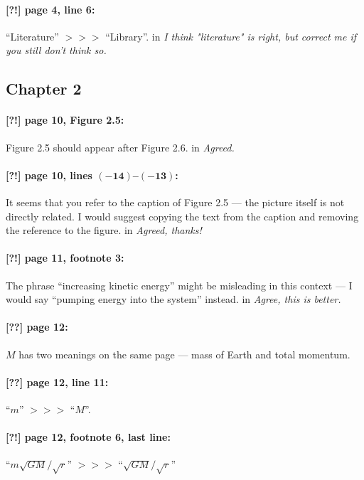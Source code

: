 \documentclass[twoside]{article}
\begin{document}
\paragraph{[?!] page 4, line 6:} “Literature” $>\!>\!>$ “Library”.
 in {\it  I think "literature" is right, but correct me if you still don't think so.}

\subsection*{Chapter 2}

\paragraph{[?!] page 10, Figure 2.5:} Figure 2.5 should appear after Figure 2.6.
 in {\it  Agreed.}

\paragraph{[?!] page 10, lines $\bm{(-14)}$--$\bm{(-13)}$:}
It seems that you refer to the caption of Figure 2.5 — the picture itself is not directly related. I would suggest copying the text from the caption and removing the reference to the figure.
 in
{\it  Agreed, thanks!}

\paragraph{[?!] page 11, footnote 3:}
The phrase “increasing kinetic energy” might be misleading in this context — I would say “pumping energy into the system” instead.
 in
{\it Agree, this is better. }

\paragraph{[??] page 12:} $M$ has two meanings on the same page --- mass of Earth and total momentum.

\paragraph{[??] page 12, line 11:} ``$m$'' $>\!>\!>$ ``$M$''.

\paragraph{[?!] page 12, footnote 6, last line:}
``$m\sqrt{GM}/\sqrt{r}$'' $>\!>\!>$ ``$\sqrt{GM}/\sqrt{r}$''
\end{document}
